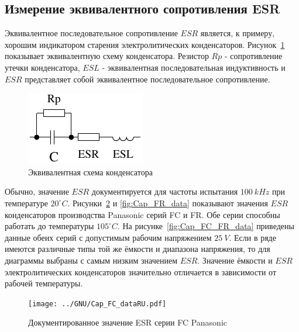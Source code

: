 \subsection{Измерение эквивалентного сопротивления ESR}
Эквивалентное последовательное сопротивление \(ESR\) \cite{ESR} является, к примеру, хорошим индикатором старения электролитических конденсаторов.
Рисунок~\ref{fig:Cap_equiv} показывает эквивалентную схему конденсатора.
Резистор \(Rp\) - сопротивление утечки конденсатора, \(ESL\) - эквивалентная последовательная индуктивность и
\(ESR\) представляет собой эквивалентное последовательное сопротивление.

\begin{figure}[H]
  \centering
    \includegraphics[width=.8\textwidth]{../FIG/Cap_equiv.pdf}
  \caption{Эквивалентная схема конденсатора}
  \label{fig:Cap_equiv}
\end{figure}

Обычно, значение \(ESR\) документируется для частоты испытания \(100~kHz\) при температуре 
\(20^{\circ} C\).
Рисунки~\ref{fig:Cap_FC_data} и \ref{fig:Cap_FR_data} показывают значения \(ESR\) конденсаторов производства 
Panasonic серий FC и  FR.
Обе серии способны работать до температуры \(105^{\circ} C\).
На рисунке~\ref{fig:Cap_FC_FR_data} приведены данные обеих серий с допустимым рабочим напряжением \(25~V\).
Если в ряде имеются различные типы той же ёмкости и диапазона напряжения, то для диаграммы выбраны 
с самым низким значением \(ESR\).
Значение ёмкости и \(ESR\) электролитических конденсаторов значительно отличается в зависимости от рабочей температуры. 

\begin{figure}[H]
  \centering
    \texttt{[image: ../GNU/Cap\_FC\_dataRU.pdf]}
  \caption{Документированное значение ESR серии FC Panasonic}
  \label{fig:Cap_FC_data}
\end{figure}

